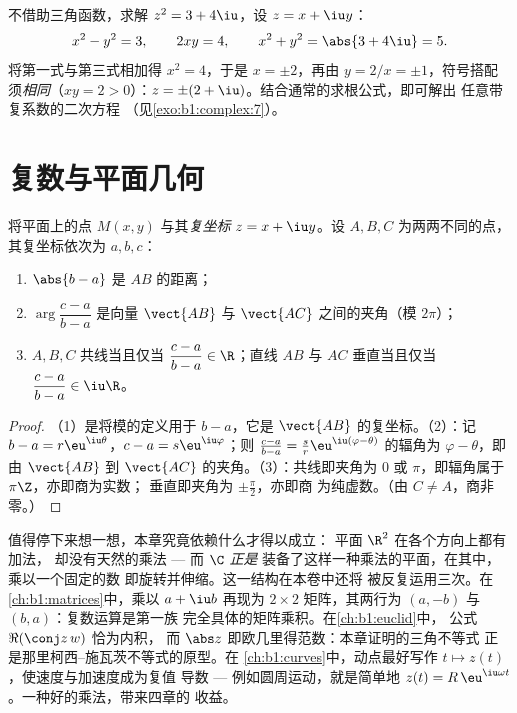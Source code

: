 \begin{example}[代数形式的平方根]\label{ex:b1:complex:sqrt}
不借助三角函数，求解 $z^2 = 3 + 4\iu$，设 $z = x + \iu y$：
\[
x^2 - y^2 = 3, \qquad 2xy = 4, \qquad x^2 + y^2 = \abs{3 + 4\iu} = 5 .
\]
将第一式与第三式相加得 $x^2 = 4$，于是 $x = \pm 2$，再由 $y = 2/x =
\pm 1$，符号搭配须\emph{相同}（$xy = 2 > 0$）：$z = \pm(2 +
\iu)$。结合通常的求根公式，即可解出
任意带复系数的二次方程
（见\cref{exo:b1:complex:7}）。
\end{example}

\section{复数与平面几何}

\begin{proposition}[几何对照]\label{prop:b1:complex:geometry}
将平面上的点 $M(x, y)$ 与其\emph{复坐标} $z = x
+ \iu y$。设 $A, B, C$ 为两两不同的点，其复坐标依次为 $a, b,
c$：
\begin{enumerate}
  \item $\abs{b - a}$ 是 $AB$ 的距离；
  \item $\arg\dfrac{c - a}{b - a}$ 是向量
        $\vect{AB}$ 与 $\vect{AC}$ 之间的夹角（模 $2\pi$）；
  \item $A, B, C$ 共线当且仅当 $\dfrac{c - a}{b - a} \in
        \R$；直线 $AB$ 与 $AC$ 垂直当且仅当
        $\dfrac{c - a}{b - a} \in \iu\R$。
\end{enumerate}
\end{proposition}

\begin{proof}
（1）是将模的定义用于 $b - a$，它是
$\vect{AB}$ 的复坐标。（2）：记 $b - a = r\eu^{\iu\theta}$，$c - a =
s\eu^{\iu\varphi}$；则 $\frac{c-a}{b-a} = \frac sr
\eu^{\iu(\varphi - \theta)}$ 的辐角为 $\varphi - \theta$，即
由 $\vect{AB}$ 到 $\vect{AC}$ 的夹角。（3）：共线即夹角为 $0$
或 $\pi$，即辐角属于 $\pi\Z$，亦即商为实数；
垂直即夹角为 $\pm\frac\pi2$，亦即商
为纯虚数。（由 $C \neq A$，商非零。）
\end{proof}

\begin{remark}[插曲：$\C$ 是赋予了乘法的平面]\label{rem:b1:complex:interlude}
值得停下来想一想，本章究竟依赖什么才得以成立：
平面 $\R^2$ 在各个方向上都有加法，
却没有天然的乘法 --- 而 $\C$ \emph{正是}
装备了这样一种乘法的平面，在其中，乘以一个固定的数
即旋转并伸缩。这一结构在本卷中还将
被反复运用三次。在\cref{ch:b1:matrices}中，乘以
$a + \iu b$ 再现为 $2 \times 2$ 矩阵，其两行为 $(a,
-b)$ 与 $(b, a)$：复数运算是第一族
完全具体的矩阵乘积。在\cref{ch:b1:euclid}中，
公式 $\Re(\conj z\,w)$ 恰为内积，
而 $\abs z$ 即欧几里得范数：本章证明的三角不等式
正是那里柯西–施瓦茨不等式的原型。在
\cref{ch:b1:curves}中，动点最好写作 $t \mapsto
z(t)$，使速度与加速度成为复值
导数 --- 例如圆周运动，就是简单地 $z(t) =
R\,\eu^{\iu\omega t}$。一种好的乘法，带来四章的
收益。
\end{remark}


